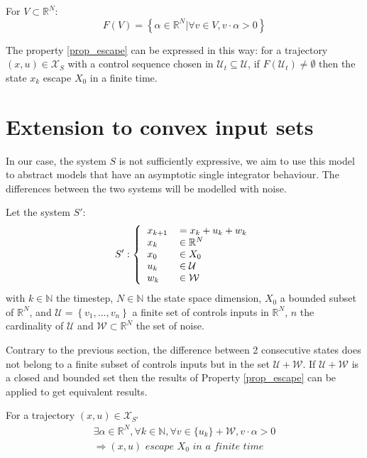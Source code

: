 For $V \subset \mathbb{R}^N$:
$$F(V) = \left \{ \alpha \in \mathbb{R}^N| \forall v \in V, v \cdot \alpha >0 \right \}$$

The property \ref{prop_escape} can be expressed in this way: for a trajectory $(x,u) \in \mathcal{X}_S$ with a control sequence chosen in $\mathcal{U}_t \subseteq \mathcal{U}$, if $F(\mathcal{U}_t) \neq \emptyset$ then the state $x_k$ escape $X_0$ in a finite time.

\section{Extension to convex input sets}\label{sec_ext_escape}

In our case, the system $S$ is not sufficiently expressive, 
we aim to use this model to abstract models that have an asymptotic single integrator behaviour.
The differences between the two systems will be modelled with noise.

Let the system $S'$:
\begin{equation}
S':\left \{
  \begin{tabular}{ll}
  $x_{k+1}$ &$= x_k + u_k + w_k$\\
  $x_k$ & $\in \mathbb{R}^N$\\
  $x_0$ & $\in X_0$\\
  $u_k$ & $\in \mathcal{U}$\\
  $w_k$ & $\in \mathcal{W}$
  \end{tabular}
\right.
\end{equation}
with $k \in \mathbb{N}$ the timestep, $N \in \mathbb{N}$ the state space dimension, $X_0$ a bounded subset of $\mathbb{R}^N$, and $\mathcal{U} = \left \{v_1,...,v_n \right \}$ a finite set of controls inputs in $\mathbb{R}^N$, $n$ the cardinality of $\mathcal{U}$ and $\mathcal{W} \subset \mathbb{R}^N$ the set of noise.

Contrary to the previous section, the difference between 2 consecutive states does not belong to a finite subset of controls inputs but in the set $\mathcal{U} + \mathcal{W}$.
If $\mathcal{U} + \mathcal{W}$ is a closed and bounded set then the results of Property \ref{prop_escape} can be applied to get equivalent results.

\begin{property} \label{prop_escape_noise}
For a trajectory $(x,u) \in \mathcal{X}_{S'}$ 
\begin{equation}
\begin{split}
\exists \alpha \in \mathbb{R}^N,
\forall k \in \mathbb{N},
\forall v \in \{u_k\} + \mathcal{W}, v \cdot \alpha > 0 \\
\Rightarrow
(x,u) \textit{ escape } X_0 \textit{ in a finite time} 
\end{split}
\end{equation}
\end{property}

